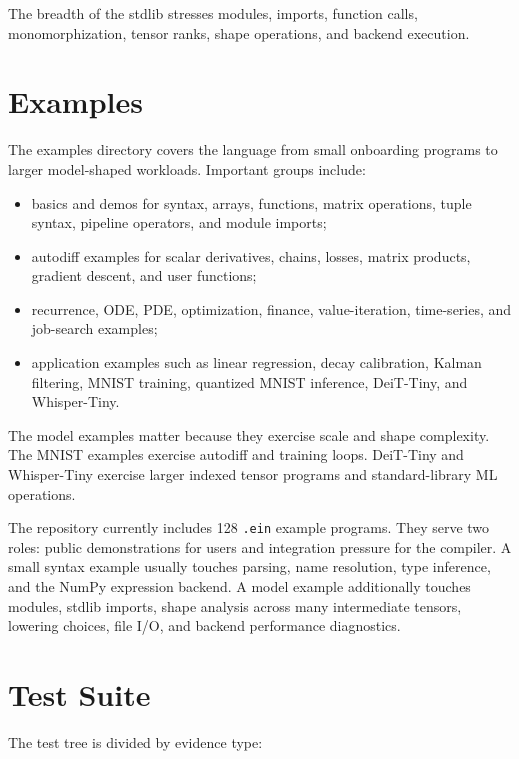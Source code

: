 The breadth of the stdlib stresses modules, imports, function calls,
monomorphization, tensor ranks, shape operations, and backend execution.

\section{Examples}

The examples directory covers the language from small onboarding programs to
larger model-shaped workloads. Important groups include:

\begin{itemize}
\item basics and demos for syntax, arrays, functions, matrix operations, tuple
syntax, pipeline operators, and module imports;
\item autodiff examples for scalar derivatives, chains, losses, matrix
products, gradient descent, and user functions;
\item recurrence, ODE, PDE, optimization, finance, value-iteration, time-series,
and job-search examples;
\item application examples such as linear regression, decay calibration,
Kalman filtering, MNIST training, quantized MNIST inference, DeiT-Tiny, and
Whisper-Tiny.
\end{itemize}

The model examples matter because they exercise scale and shape complexity. The
MNIST examples exercise autodiff and training loops. DeiT-Tiny and Whisper-Tiny
exercise larger indexed tensor programs and standard-library ML operations.

The repository currently includes 128 \texttt{.ein} example programs. They
serve two roles: public demonstrations for users and integration pressure for
the compiler. A small syntax example usually touches parsing, name resolution,
type inference, and the NumPy expression backend. A model example additionally
touches modules, stdlib imports, shape analysis across many intermediate
tensors, lowering choices, file I/O, and backend performance diagnostics.

\section{Test Suite}

The test tree is divided by evidence type:

